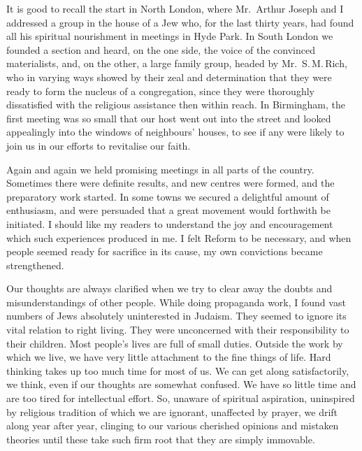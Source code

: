 It is good to recall the start in North London, where
Mr.\ Arthur Joseph and I addressed a group in the house
of a Jew who, for the last thirty years, had found all his
spiritual nourishment in meetings in Hyde Park. In
South London we founded a section and heard, on the
one side, the voice of the convinced materialists, and,
on the other, a large family group, headed by
Mr.\ S.\,M.\,Rich, who in varying ways showed by their zeal and
determination that they were ready to form the nucleus
of a congregation, since they were thoroughly dissatisfied
with the religious assistance then within reach. In
Birmingham, the first meeting was so small that our
host went out into the street and looked appealingly into
the windows of neighbours’ houses, to see if any were
likely to join us in our efforts to revitalise our faith.

Again and again we held promising meetings in all
parts of the country. Sometimes there were definite
results, and new centres were formed, and the preparatory
work started. In some towns we secured a delightful
amount of enthusiasm, and were persuaded that a great
movement would forthwith be initiated. I should like
my readers to understand the joy and encouragement
which such experiences produced in me. I felt Reform
to be necessary, and when people seemed ready for
sacrifice in its cause, my own convictions became strengthened.

Our thoughts are always clarified when we try to
clear away the doubts and misunderstandings of other
people. While doing propaganda work, I found vast
numbers of Jews absolutely uninterested in Judaism.
They seemed to ignore its vital relation to right living.
They were unconcerned with their responsibility to their
children. Most people’s lives are full of small duties.
Outside the work by which we live, we have very little
attachment to the fine things of life. Hard thinking
takes up too much time for most of us. We can get
along satisfactorily, we think, even if our thoughts are
somewhat confused. We have so little time and are too
tired for intellectual effort. So, unaware of spiritual
aspiration, uninspired by religious tradition of which
we are ignorant, unaffected by prayer, we drift along
year after year, clinging to our various cherished
opinions and mistaken theories until these take such
firm root that they are simply immovable.


